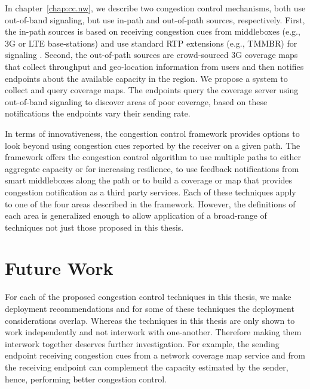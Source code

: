 In chapter~\ref{chap:cc.nw}, we describe two congestion control mechanisms,
both use out-of-band signaling, but use in-path and out-of-path sources,
respectively. First, the in-path sources is based on receiving congestion cues
from middleboxes (e.g., 3G or LTE base-stations) and use standard RTP
extensions (e.g., TMMBR) for signaling . Second, the out-of-path sources are
crowd-sourced 3G coverage maps that collect throughput and geo-location
information from users and then notifies endpoints about the available
capacity in the region. We propose a system to collect and query coverage
maps. The endpoints query the coverage server using out-of-band signaling to
discover areas of poor coverage, based on these notifications the endpoints
vary their sending rate.

In terms of innovativeness, the congestion control framework provides options
to look beyond using congestion cues reported by the receiver on a given path.
The framework offers the congestion control algorithm to use multiple paths to
either aggregate capacity or for increasing resilience, to use feedback
notifications from smart middleboxes along the path or to build a coverage or
map that provides congestion notification as a third party services. Each of
these techniques apply to one of the four areas described in the framework.
However, the definitions of each area is generalized enough to allow
application of a broad-range of techniques not just those proposed in this
thesis.


\section{Future Work}

For each of the proposed congestion control techniques in this thesis, we make
deployment recommendations and for some of these techniques the deployment
considerations overlap. Whereas the techniques in this thesis are only shown
to work independently and not interwork with one-another. Therefore making
them interwork together deserves further investigation. For example, the
sending endpoint receiving congestion cues from a network coverage map service
and from the receiving endpoint can complement the capacity estimated by the
sender, hence, performing better congestion control.

